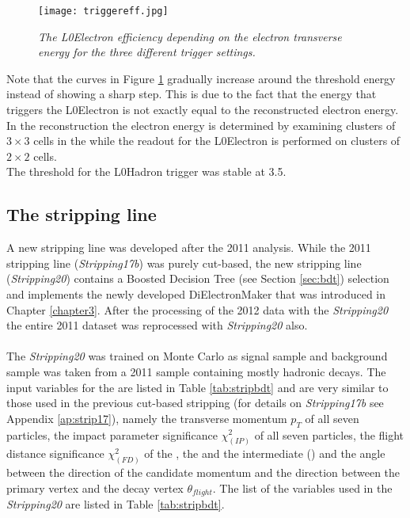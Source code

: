 \begin{figure}[ht]
\begin{center}
\texttt{[image: triggereff.jpg]}
\end{center}
\vspace*{-0.5cm}
\caption{\textit{The L0Electron efficiency depending on the electron transverse energy for the three different trigger settings.}}
\label{fig:trigger}
\end{figure}
Note that the curves in Figure \ref{fig:trigger} gradually increase around the threshold energy instead of showing a sharp step. This is due to the fact that the energy that triggers the L0Electron is not exactly equal to the reconstructed electron energy. In the reconstruction the electron energy is determined by examining clusters of $3\times 3$ cells in the \ecal while the readout for the L0Electron is performed on clusters of $2\times 2$ cells.\\
The threshold for the L0Hadron trigger was stable at 3.5\gevcc.\\

\subsection{The \BdKstee stripping line}
\label{sec:strips}
A new \BdKstee stripping line was developed after the 2011 analysis. While the 2011 stripping line (\textit{Stripping17b}) was purely cut-based, the new stripping line (\textit{Stripping20}) contains a Boosted Decision Tree (see Section \ref{sec:bdt}) selection and implements the newly developed DiElectronMaker that was introduced in Chapter \ref{chapter3}. After the processing of the 2012 \lhcb data with the \textit{Stripping20} the entire 2011 dataset was reprocessed with \textit{Stripping20} also.\\
\\
The \textit{Stripping20} \bdtn was trained on \BdKstee Monte Carlo as signal sample and background sample was taken from a 2011 \lhcb sample containing mostly hadronic decays. The input variables for the \bdtn are listed in Table \ref{tab:stripbdt} and are very similar to those used in the previous cut-based stripping (for details on \textit{Stripping17b} see Appendix \ref{ap:strip17}), namely the transverse momentum $p_T$ of all seven particles, the impact parameter significance $\chi^2_{(IP)}$ of all seven particles, the flight distance significance $\chi^2_{(FD)}$ of the \Bd, the \Kstarz and the intermediate (\epem) and the angle between the direction of the \Bd candidate momentum and the direction between the primary vertex and the \B decay vertex $\theta_{flight}$. The list of the variables used in the \textit{Stripping20} \bdtn are listed in Table \ref{tab:stripbdt}. \newpage

